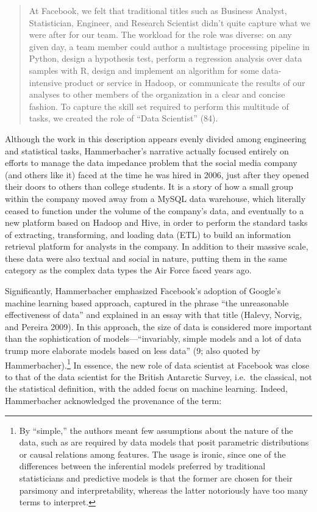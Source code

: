 \documentclass[
  letterpaper,
]{report}
\begin{document}
\begin{quote}
At Facebook, we felt that traditional titles such as Business Analyst,
Statistician, Engineer, and Research Scientist didn't quite capture what
we were after for our team. The workload for the role was diverse: on
any given day, a team member could author a multistage processing
pipeline in Python, design a hypothesis test, perform a regression
analysis over data samples with R, design and implement an algorithm for
some data-intensive product or service in Hadoop, or communicate the
results of our analyses to other members of the organization in a clear
and concise fashion. To capture the skill set required to perform this
multitude of tasks, we created the role of ``Data Scientist'' (84).
\end{quote}

Although the work in this description appears evenly divided among
engineering and statistical tasks, Hammerbacher's narrative actually
focused entirely on efforts to manage the data impedance problem that
the social media company (and others like it) faced at the time he was
hired in 2006, just after they opened their doors to others than college
students. It is a story of how a small group within the company moved
away from a MySQL data warehouse, which literally ceased to function
under the volume of the company's data, and eventually to a new platform
based on Hadoop and Hive, in order to perform the standard tasks of
extracting, transforming, and loading data (ETL) to build an information
retrieval platform for analysts in the company. In addition to their
massive scale, these data were also textual and social in nature,
putting them in the same category as the complex data types the Air
Force faced years ago.

Significantly, Hammerbacher emphasized Facebook's adoption of Google's
machine learning based approach, captured in the phrase ``the
unreasonable effectiveness of data'' and explained in an essay with that
title (Halevy, Norvig, and Pereira 2009). In this approach, the size of
data is considered more important than the sophistication of
models---``invariably, simple models and a lot of data trump more
elaborate models based on less data'' (9; also quoted by
Hammerbacher).\footnote{By ``simple,'' the authors meant few assumptions
  about the nature of the data, such as are required by data models that
  posit parametric distributions or causal relations among features. The
  usage is ironic, since one of the differences between the inferential
  models preferred by traditional statisticians and predictive models is
  that the former are chosen for their parsimony and interpretability,
  whereas the latter notoriously have too many terms to interpret.} In
essence, the new role of data scientist at Facebook was close to that of
the data scientist for the British Antarctic Survey, i.e.~the classical,
not the statistical definition, with the added focus on machine
learning. Indeed, Hammerbacher acknowledged the provenance of the term:
\end{document}
